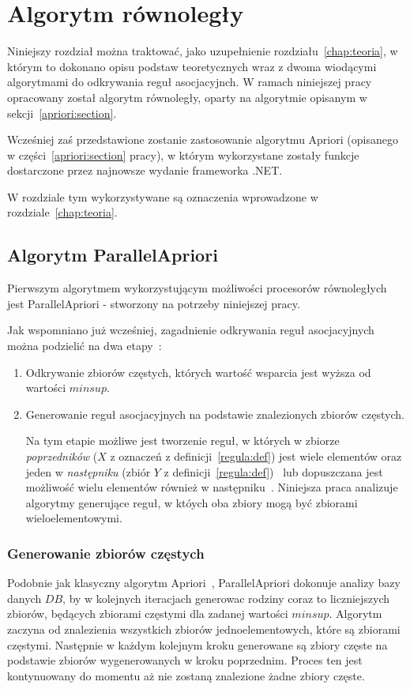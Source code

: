 \chapter{Algorytm równoległy\label{chap:algorytm}}

Niniejszy rozdział można traktować, jako uzupełnienie rozdziału~\ref{chap:teoria}, w którym to dokonano opisu podstaw teoretycznych wraz z dwoma wiodącymi algorytmami do odkrywania reguł asocjacyjnch. W ramach niniejszej pracy opracowany został algorytm równoległy, oparty na algorytmie opisanym w sekcji~\ref{apriori:section}.

Wcześniej zaś przedstawione zostanie zastosowanie algorytmu Apriori (opisanego w części~\ref{apriori:section} pracy), w którym wykorzystane zostały funkcje dostarczone przez najnowsze wydanie frameworka .NET. 

W rozdziale tym wykorzystywane są oznaczenia wprowadzone w rozdziale~\ref{chap:teoria}.

\section{Algorytm ParallelApriori\label{sec:papriori}}
Pierwszym algorytmem wykorzystującym możliwości procesorów równoległych jest ParallelApriori - stworzony na potrzeby niniejszej pracy. 

Jak wspomniano już wcześniej, zagadnienie odkrywania reguł asocjacyjnych można podzielić na dwa etapy~\cite{Problem:Statement}:
\begin{enumerate}
	\item Odkrywanie zbiorów częstych, których wartość wsparcia jest wyższa od wartości $minsup$.
	\item Generowanie reguł asocjacyjnych na podstawie znalezionych zbiorów częstych.

	Na tym etapie możliwe jest tworzenie reguł, w których w zbiorze \emph{poprzedników} ($X$ z oznaczeń z definicji~\ref{regula:def}) jest wiele elementów oraz jeden w \emph{następniku} (zbiór $Y$ z definicji~\ref{regula:def})~\cite{Problem:Statement} lub dopuszczana jest możliwość wielu elementów również w następniku~\cite{Apriori:Main}. Niniejsza praca analizuje algorytmy generujące reguł, w któych oba zbiory mogą być zbiorami wieloelementowymi.
\end{enumerate}

\subsection{Generowanie zbiorów częstych}\label{papriori:gen}
Podobnie jak klasyczny algorytm Apriori~\cite{Apriori:Main}, ParallelApriori dokonuje analizy bazy danych $DB$, by w kolejnych iteracjach generowac rodziny coraz to liczniejszych zbiorów, będących zbiorami częstymi dla zadanej wartości $minsup$. Algorytm zaczyna od znalezienia wszystkich zbiorów jednoelementowych, które są zbiorami częstymi. Następnie w każdym kolejnym kroku generowane są zbiory częste na podstawie zbiorów wygenerowanych w kroku poprzednim. Proces ten jest kontynuowany do momentu aż nie zostaną znalezione żadne zbiory częste.

